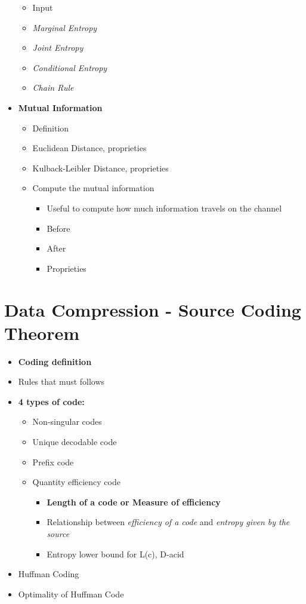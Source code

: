 \begin{itemize}
    \begin{itemize}
        \item Input
        \item \textit{Marginal Entropy}
        \item \textit{Joint Entropy}
        \item \textit{Conditional Entropy}
        \item \textit{Chain Rule}
    \end{itemize}
    \item \textbf{Mutual Information}
    \begin{itemize}
        \item Definition
        \item Euclidean Distance, proprieties
        \item Kulback-Leibler Distance, proprieties
        \item Compute the mutual information
        \begin{itemize}
            \item Useful to compute how much information travels on the channel
            \item Before
            \item After
            \item Proprieties
        \end{itemize}
    \end{itemize}
\end{itemize}


\chapter{Data Compression - Source Coding Theorem}
\begin{itemize}
    \item \textbf{Coding definition}
    \item Rules that must follows
    \item \textbf{4 types of code:}
    \begin{itemize}
        \item Non-singular codes
        \item Unique decodable code
        \item Prefix code
        \item Quantity efficiency code
        \begin{itemize}
            \item \textbf{Length of a code or Measure of efficiency}
            \item Relationship between \textit{efficiency of a code} and \textit{entropy given by the source}
            \item Entropy lower bound for L(c), D-acid 
        \end{itemize}
    \end{itemize}
    \item Huffman Coding
    \item Optimality of Huffman Code
\end{itemize}

